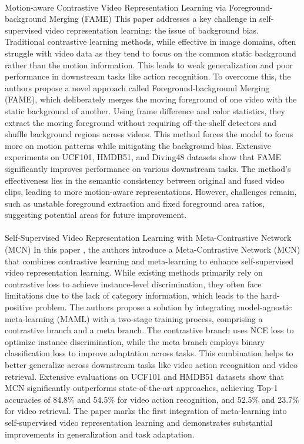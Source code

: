 \documentclass[11pt,a4paper]{report}
\begin{document}
\paragraph{} Motion-aware Contrastive Video Representation Learning via Foreground-background Merging (FAME) \cite{ding2022motion}
This paper addresses a key challenge in self-supervised video representation learning: the issue of background bias. Traditional contrastive learning methods, while effective in image domains, often struggle with video data as they tend to focus on the common static background rather than the motion information. This leads to weak generalization and poor performance in downstream tasks like action recognition. To overcome this, the authors propose a novel approach called Foreground-background Merging (FAME), which deliberately merges the moving foreground of one video with the static background of another. Using frame difference and color statistics, they extract the moving foreground without requiring off-the-shelf detectors and shuffle background regions across videos. This method forces the model to focus more on motion patterns while mitigating the background bias. Extensive experiments on UCF101, HMDB51, and Diving48 datasets show that FAME significantly improves performance on various downstream tasks. The method's effectiveness lies in the semantic consistency between original and fused video clips, leading to more motion-aware representations. However, challenges remain, such as unstable foreground extraction and fixed foreground area ratios, suggesting potential areas for future improvement.

\paragraph{} Self-Supervised Video Representation Learning with Meta-Contrastive Network (MCN)
In this paper \cite{Lin2021}, the authors introduce a Meta-Contrastive Network (MCN) that combines contrastive learning and meta-learning to enhance self-supervised video representation learning. While existing methods primarily rely on contrastive loss to achieve instance-level discrimination, they often face limitations due to the lack of category information, which leads to the hard-positive problem. The authors propose a solution by integrating model-agnostic meta-learning (MAML) with a two-stage training process, comprising a contrastive branch and a meta branch. The contrastive branch uses NCE loss to optimize instance discrimination, while the meta branch employs binary classification loss to improve adaptation across tasks. This combination helps to better generalize across downstream tasks like video action recognition and video retrieval. Extensive evaluations on UCF101 and HMDB51 datasets show that MCN significantly outperforms state-of-the-art approaches, achieving Top-1 accuracies of 84.8\% and 54.5\% for video action recognition, and 52.5\% and 23.7\% for video retrieval. The paper marks the first integration of meta-learning into self-supervised video representation learning and demonstrates substantial improvements in generalization and task adaptation.
\end{document}
